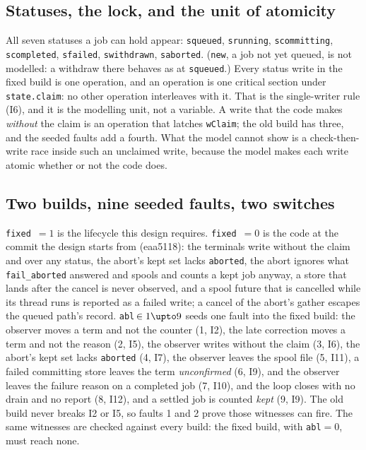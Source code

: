 \documentclass[a4paper,10pt,fleqn]{article}
\newcommand{\field}[1]{\texttt{#1}}
\begin{document}
\subsection{Statuses, the lock, and the unit of atomicity}

All seven statuses a job can hold appear: \field{squeued}, \field{srunning},
\field{scommitting}, \field{scompleted}, \field{sfailed}, \field{swithdrawn},
\field{saborted}. (\field{new}, a job not yet queued, is not modelled: a
withdraw there behaves as at \field{squeued}.) Every status write in the fixed
build is one operation, and an operation is one critical section under
\field{state.claim}: no other operation interleaves with it. That is the
single-writer rule (I6), and it is the modelling unit, not a variable. A write
that the code makes \emph{without} the claim is an operation that latches
\field{wClaim}; the old build has three, and the seeded faults add a fourth.
What the model cannot show is a check-then-write race inside such an unclaimed
write, because the model makes each write atomic whether or not the code does.

\subsection{Two builds, nine seeded faults, two switches}

\field{fixed}~$=1$ is the lifecycle this design requires. \field{fixed}~$=0$ is
the code at the commit the design starts from (eaa5118): the terminals write
without the claim and over any status, the abort's kept set lacks
\field{aborted}, the abort ignores what \field{fail\_aborted} answered and
spools and counts a kept job anyway, a store that lands after the cancel is never
observed, and a spool future that is cancelled while its thread runs is reported
as a failed write; a cancel of the abort's gather escapes the queued path's
record. \field{abl}$\,\in 1\upto9$ seeds one fault into the fixed build: the
observer moves a term and not the counter (1, I2), the late correction moves a
term and not the reason (2, I5), the observer writes without the claim (3, I6), the
abort's kept set lacks \field{aborted} (4, I7), the observer leaves the spool file
(5, I11), a failed committing store leaves the term \emph{unconfirmed} (6, I9), and
the observer leaves the failure reason on a completed job (7, I10), and the loop
closes with no drain and no report (8, I12), and a settled job is counted \emph{kept}
(9, I9). The old build
never breaks I2 or I5, so faults 1 and 2 prove those witnesses can fire. The same witnesses are
checked against every build: the fixed build, with \field{abl}$=0$, must reach
none.
\end{document}
